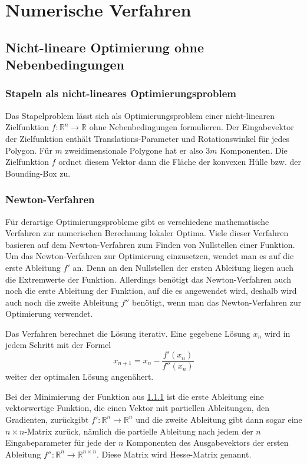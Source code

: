 \documentclass[runningheads,a4paper]{llncs}
\begin{document}
\section{Numerische Verfahren}

\subsection{Nicht-lineare Optimierung ohne Nebenbedingungen}
\label{sec:uncon_nonlin_opt}

\subsubsection{Stapeln als nicht-lineares Optimierungsproblem}
\label{formObjStacking}
\begin{sloppypar}
Das Stapelproblem lässt sich als Optimierungsproblem einer nicht-linearen Zielfunktion ${f: \mathbb{R}^n \rightarrow \mathbb{R}}$ ohne Nebenbedingungen formulieren. Der Eingabevektor der Zielfunktion enthält Translations-Parameter und Rotationswinkel für jedes Polygon. Für $m$ zweidimensionale Polygone hat er also $3m$ Komponenten.
Die Zielfunktion $f$ ordnet diesem Vektor dann die Fläche der konvexen Hülle bzw. der Bounding-Box zu.
\end{sloppypar}

\subsubsection{Newton-Verfahren}
Für derartige Optimierungsprobleme gibt es verschiedene mathematische Verfahren zur numerischen Berechnung lokaler Optima. Viele dieser Verfahren basieren auf dem Newton-Verfahren zum Finden von Nullstellen einer Funktion. Um das Newton-Verfahren zur Optimierung einzusetzen, wendet man es auf die erste Ableitung $f'$ an. Denn an den Nullstellen der ersten Ableitung liegen auch die Extremwerte der Funktion. Allerdings benötigt das Newton-Verfahren auch noch die erste Ableitung der Funktion, auf die es angewendet wird, deshalb wird auch noch die zweite Ableitung $f''$ benötigt, wenn man das Newton-Verfahren zur Optimierung verwendet.

Das Verfahren berechnet die Lösung iterativ. Eine gegebene Lösung $x_n$ wird in jedem Schritt mit der Formel
\begin{equation*}
x_{n+1} = x_n - \frac{f'(x_n)}{f''(x_n)}
\end{equation*}
weiter der optimalen Lösung angenähert.

Bei der Minimierung der Funktion aus \ref{formObjStacking} ist die erste Ableitung eine vektorwertige Funktion, die einen Vektor mit partiellen Ableitungen, den Gradienten, zurückgibt ${f': \mathbb{R}^n \rightarrow \mathbb{R}^n}$ und die zweite Ableitung gibt dann sogar eine ${n\times n}$-Matrix zurück, nämlich die partielle Ableitung nach jedem der $n$ Eingabeparameter für jede der $n$ Komponenten des Ausgabevektors der ersten Ableitung ${f'': \mathbb{R}^n \rightarrow \mathbb{R}^{n\times n}}$. Diese Matrix wird Hesse-Matrix genannt.
\end{document}
